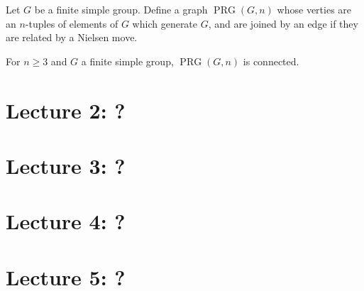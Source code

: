 \documentclass[12pt]{article}
\begin{document}
\begin{definition}\label{def:The_Graph_PRG}
    Let $G$ be a finite simple group. Define a graph $\operatorname{PRG}(G,n)$ whose verties are an $n$-tuples of elements of $G$ which generate $G$, and are joined by an edge if they are related by a Nielsen move.
\end{definition}

\begin{conjecture}\label{conj:Weigold_Conjecture}
    For $n \geq 3$ and $G$ a finite simple group, $\operatorname{PRG}(G,n)$ is connected.
\end{conjecture}

\section{Lecture 2: ?}
\section{Lecture 3: ?}
\section{Lecture 4: ?}
\section{Lecture 5: ?}
\end{document}
